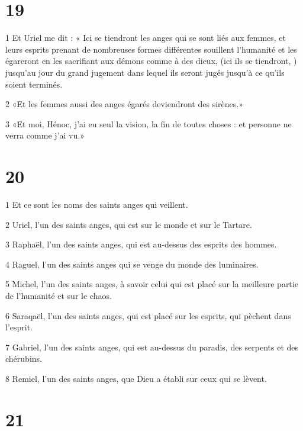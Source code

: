 \chapter{19}

\par 1 Et Uriel me dit : « Ici se tiendront les anges qui se sont liés aux femmes, et leurs esprits prenant de nombreuses formes différentes souillent l'humanité et les égareront en les sacrifiant aux démons comme à des dieux, (ici ils se tiendront, ) jusqu'au jour du grand jugement dans lequel ils seront jugés jusqu'à ce qu'ils soient terminés.
\par 2 «Et les femmes aussi des anges égarés deviendront des sirènes.»
\par 3 «Et moi, Hénoc, j'ai eu seul la vision, la fin de toutes choses : et personne ne verra comme j'ai vu.»

\chapter{20}

\par 1 Et ce sont les noms des saints anges qui veillent.
\par 2 Uriel, l'un des saints anges, qui est sur le monde et sur le Tartare.
\par 3 Raphaël, l'un des saints anges, qui est au-dessus des esprits des hommes.
\par 4 Raguel, l'un des saints anges qui se venge du monde des luminaires.
\par 5 Michel, l'un des saints anges, à savoir celui qui est placé sur la meilleure partie de l'humanité et sur le chaos.
\par 6 Saraqaël, l'un des saints anges, qui est placé sur les esprits, qui pèchent dans l'esprit.
\par 7 Gabriel, l'un des saints anges, qui est au-dessus du paradis, des serpents et des chérubins.
\par 8 Remiel, l'un des saints anges, que Dieu a établi sur ceux qui se lèvent.

\chapter{21}

